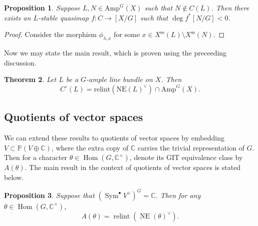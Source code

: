 \documentclass{amsart}
\newtheorem{thm}{Theorem}[section]
\newtheorem{prop}[thm]{Proposition}
\theoremstyle{definition}
\theoremstyle{remark}
\theoremstyle{plain}
\theoremstyle{definition}
\theoremstyle{remark}
\newcommand{\C}{\mathbb{C}}
\renewcommand{\P}{\mathbb{P}}
\newcommand{\mr}[1]{\mathrm{#1}}
\newcommand{\on}[1]{\operatorname{#1}}
\newcommand{\1}{\mathbf{1}}
\newcommand{\2}{\mathbf{2}}
\newcommand{\3}{\mathbf{3}}
\DeclareMathOperator{\Hom}{Hom}
\begin{document}
\begin{prop}
    Suppose $L, N \in \mr{Amp}^G(X)$ such that $N \notin C(L)$. Then there exists an $L$-stable quasimap $f \colon C \to [X/G]$ such that $\deg f^* [N/G] < 0$.
\end{prop}

\begin{proof}
    Consider the morphism $\phi_{\lambda, x}$ for some $x \in X^{\mr{ss}}(L) \setminus X^{\mr{ss}}(N)$.
\end{proof}

Now we may state the main result, which is proven using the preceeding discussion.

\begin{thm}
    Let $L$ be a $G$-ample line bundle on $X$. Then
    \[ C^{\circ}(L) = \mr{relint}(\mr{NE}(L)^{\vee}) \cap \mr{Amp}^G(X). \]
\end{thm}

\subsection{Quotients of vector spaces}

We can extend these results to quotients of vector spaces by embedding $V \subset \P(V \oplus \C)$, where the extra copy of $\C$ carries the trivial representation of $G$. Then for a character $\theta \in \Hom(G, \C^{\times})$, denote its GIT equivalence class by $A(\theta)$. The main result in the context of quotients of vector spaces is stated below.

\begin{prop}
    Suppose that $(\on{Sym}^{\bullet} V^{\vee})^G = \C$. Then for any $\theta \in \Hom(G, \C^{\times})$, 
    \[ A(\theta) = \on{relint}(\on{NE}(\theta)^{\vee}). \]
\end{prop}
\end{document}
